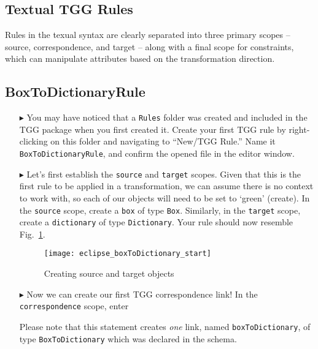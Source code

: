 \newpage
\hypertarget{rules tex}{}
\subsection{Textual TGG Rules}
\texHeader

Rules in the texual syntax are clearly separated into three primary scopes -- source, correspondence, and target -- along with a final scope for constraints,
which can manipulate attributes based on the transformation direction.

\subsection{BoxToDictionaryRule}

\begin{itemize}

\item[$\blacktriangleright$] You may have noticed that a \texttt{Rules} folder was created and included in the TGG package when you first created it. Create
your first TGG rule by right-clicking on this folder and navigating to ``New/TGG Rule.'' Name it \texttt{BoxToDictionaryRule}, and confirm the opened file
in the editor window.

\item[$\blacktriangleright$] Let's first establish the \texttt{source} and \texttt{target} scopes. Given that this is the first rule to be applied in a
transformation, we can assume there is no context to work with, so each of our objects will need to be set to `green' (create). In the \texttt{source} scope,
create a \texttt{box} of type \texttt{Box}. Similarly, in the \texttt{target} scope, create a \texttt{dictionary} of type \texttt{Dictionary}. Your rule
should now resemble Fig.~\ref{eclipse:textSourceRule}.

\vspace{0.5cm}

\begin{figure}[htbp]
\begin{center}
  \texttt{[image: eclipse\_boxToDictionary\_start]}
  \caption{Creating source and target objects}
  \label{eclipse:textSourceRule}
\end{center}
\end{figure}

\item[$\blacktriangleright$] Now we can create our first TGG correspondence link! In the \texttt{corr\-es\-pond\-ence} scope, enter 


Please note that this statement creates \emph{one} link, named \texttt{box\-To\-Dict\-ion\-ary}, of type \texttt{Box\-To\-Dict\-ion\-ary} which was declared in
the schema.

\end{itemize}

